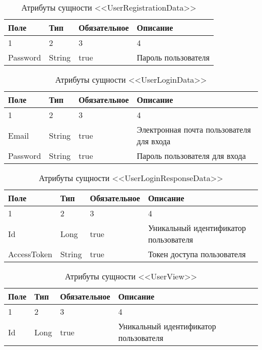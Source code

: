 \begin{xltabular}{\textwidth}{|l|l|p{1.7cm}|X|}
    \caption{Атрибуты сущности <<UserRegistrationData>>}\\ \hline
    Поле & Тип & Обяза\-тельное & Описание \\  & 2 & 3 & 4 \\ \hline
    Password & String & true & Пароль пользователя \\ \hline
\end{xltabular}

\begin{xltabular}{\textwidth}{|l|l|p{1.7cm}|X|}
    \caption{Атрибуты сущности <<UserLoginData>>}\\ \hline
    Поле & Тип & Обяза\-тельное & Описание \\  & 2 & 3 & 4 \\ \hline
    Email & String & true & Электронная почта пользователя для входа \\ \hline
    Password & String & true & Пароль пользователя для входа \\ \hline
\end{xltabular}

\begin{xltabular}{\textwidth}{|l|l|p{1.7cm}|X|}
    \caption{Атрибуты сущности <<UserLoginResponseData>>}\\ \hline
    Поле & Тип & Обяза\-тельное & Описание \\  & 2 & 3 & 4 \\ \hline
    Id & Long & true & Уникальный идентификатор пользователя \\ \hline
    AccessToken & String & true & Токен доступа пользователя \\ \hline
\end{xltabular}

\begin{xltabular}{\textwidth}{|l|l|p{1.7cm}|X|}
    \caption{Атрибуты сущности <<UserView>>}\\ \hline
    Поле & Тип & Обяза\-тельное & Описание \\  & 2 & 3 & 4 \\ \hline
    Id & Long & true & Уникальный идентификатор пользователя \\ \hline
\end{xltabular}

